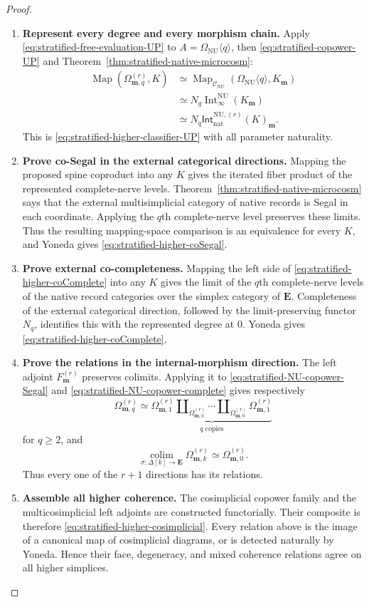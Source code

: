 \documentclass[oneside]{article}
\theoremstyle{plain}
\theoremstyle{definition}
\theoremstyle{remark}
\newcommand{\CNU}{\mathcal C_{\mathrm{NU}}}
\newcommand{\Int}{\operatorname{Int}}
\newcommand{\Map}{\operatorname{Map}}
\newcommand{\NU}{\mathrm{NU}}
\begin{document}
\begin{proof}
\leavevmode
\begin{enumerate}
\item \textbf{Represent every degree and every morphism chain.}
Apply \eqref{eq:stratified-free-evaluation-UP} to
$A=\Omega_{\NU}\langle q\rangle$, then
\eqref{eq:stratified-copower-UP} and
Theorem~\ref{thm:stratified-native-microcosm}:
\begin{align*}
 \Map(\Omega^{(r)}_{\mathbf m,q},K)
 &\simeq\Map_{\CNU}(\Omega_{\NU}\langle q\rangle,K_{\mathbf m})\\
 &\simeq N_q\Int^{\NU}_\infty(K_{\mathbf m})\\
 &\simeq N_q\mathsf{Int}^{\NU,(r)}_{\mathrm{nat}}(K)_{\mathbf m}.
\end{align*}
This is \eqref{eq:stratified-higher-classifier-UP} with all
parameter naturality.
\item \textbf{Prove co-Segal in the external categorical directions.}
Mapping the proposed spine coproduct into any $K$ gives the
iterated fiber product of the represented complete-nerve levels.
Theorem~\ref{thm:stratified-native-microcosm} says that the external
multisimplicial category of native records is Segal in each coordinate.
Applying the $q$th complete-nerve level preserves these limits.
Thus the resulting mapping-space comparison is an equivalence for
every $K$, and Yoneda gives
\eqref{eq:stratified-higher-coSegal}.
\item \textbf{Prove external co-completeness.}
Mapping the left side of
\eqref{eq:stratified-higher-coComplete} into any $K$ gives the limit
of the $q$th complete-nerve levels of the native record categories
over the simplex category of $\mathbf E$.  Completeness of the
external categorical direction, followed by the limit-preserving
functor $N_q$, identifies this with the represented degree at $0$.
Yoneda gives \eqref{eq:stratified-higher-coComplete}.
\item \textbf{Prove the relations in the internal-morphism direction.}
The left adjoint $F^{(r)}_{\mathbf m}$ preserves colimits.
Applying it to
\eqref{eq:stratified-NU-copower-Segal} and
\eqref{eq:stratified-NU-copower-complete} gives respectively
\[
 \Omega^{(r)}_{\mathbf m,q}
 \simeq\underbrace{
 \Omega^{(r)}_{\mathbf m,1}
 \amalg_{\Omega^{(r)}_{\mathbf m,0}}\cdots
 \amalg_{\Omega^{(r)}_{\mathbf m,0}}
 \Omega^{(r)}_{\mathbf m,1}}_{q\text{ copies}}
\]
for $q\geq2$, and
\[
 \operatorname*{colim}_{\sigma:\Delta[k]\to\mathbf E}
 \Omega^{(r)}_{\mathbf m,k}
 \simeq\Omega^{(r)}_{\mathbf m,0}.
\]
Thus every one of the $r+1$ directions has its relations.
\item \textbf{Assemble all higher coherence.}
The cosimplicial copower family and the multicosimplicial left
adjoints are constructed functorially.  Their composite is therefore
\eqref{eq:stratified-higher-cosimplicial}.  Every relation above is
the image of a canonical map of cosimplicial diagrams, or is detected
naturally by Yoneda.  Hence their face, degeneracy, and mixed
coherence relations agree on all higher simplices.\qedhere
\end{enumerate}
\end{proof}
\end{document}
